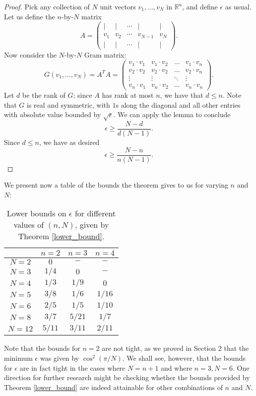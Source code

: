\documentclass[11pt,letterpaper,twoside,english]{article}
\theoremstyle{theorem}
\theoremstyle{remark}
\begin{document}
\begin{proof}
Pick any collection of $N$ unit vectors $v_1,\ldots, v_N$ in $\mathbb R^n$, and define $\epsilon$ as usual. Let us define the $n$-by-$N$ matrix
\[A=\left(\begin{matrix}
| & | & \cdots & | & |\\
v_1 & v_2 & \cdots & v_{N-1} & v_N\\
| & | & \cdots & | & | \end{matrix}\right).\] 
Now consider the $N$-by-$N$ Gram matrix:
\[G(v_1,\ldots, v_N)=A^TA=\left(\begin{matrix}
v_1\cdot v_1 & v_1\cdot v_2 & \ldots & v_1\cdot v_n\\
v_2\cdot v_2 & v_2\cdot v_2 & \ldots & v_2\cdot v_n\\
\vdots & \vdots & \ddots & \vdots\\
v_n\cdot v_1 & v_n\cdot v_2 & \ldots & v_n\cdot v_n\end{matrix}\right).\]
Let $d$ be the rank of $G$; since $A$ has rank at most $n$, we have that $d\leq n$. Note that $G$ is real and symmetric, with $1$s along the diagonal and all other entries with absolute value bounded by $\sqrt \epsilon$. We can apply the lemma to conclude
\[\epsilon\geq \frac{N-d}{d(N-1)}.\]
Since $d\leq n$, we have as desired
\[\epsilon\geq \frac{N-n}{n(N-1)}.\]
\end{proof}
We present now a table of the bounds the theorem gives to us for varying $n$ and $N$:
\begin{table}[h]
   \centering
    \begin{tabular}{ | c | c | c | c |}
    \hline
      & $n=2$ & $n=3$ & $n=4$ \\ \hline
    $N=2$ & $0$ & $-$ & $-$ \\ \hline
    $N=3$ & $1/4$ & $0$ & $-$ \\ \hline
    $N=4$ & $1/3$ & $1/9$ & $0$ \\ \hline
    $N=5$ & $3/8$ & $1/6$ & $1/16$ \\ \hline
    $N=6$ & $2/5$ & $1/5$ & $1/10$ \\ \hline
    $N=8$ &  $3/7$ & $5/21$ & $1/7$ \\ \hline
    $N=12$ & $5/11$ & $3/11$ & $2/11$ \\
    \hline
    \end{tabular}
    \caption {Lower bounds on $\epsilon$ for different values of $(n, N)$, given by Theorem \ref{lower_bound}.}
    \end{table}

Note that the bounds for $n=2$ are not tight, as we proved in Section 2 that the minimum $\epsilon$ was given by $\cos^2(\pi/N)$. We shall see, however, that the bounds for $\epsilon$ are in fact tight in the cases where $N=n+1$ and where $n=3, N=6$. One direction for further research might be checking whether the bounds provided by Theorem \ref{lower_bound} are indeed attainable for other combinations of $n$ and $N$.
\end{document}
